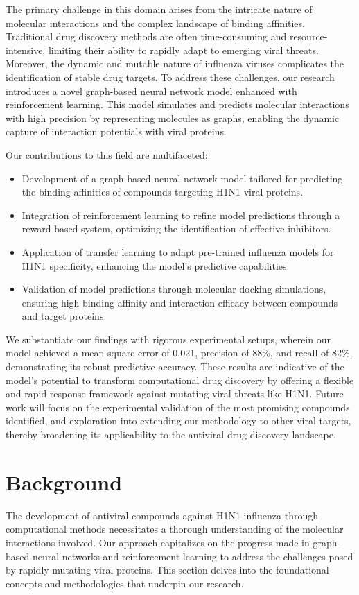 \documentclass{article}
\begin{document}
The primary challenge in this domain arises from the intricate nature of molecular interactions and the complex landscape of binding affinities. Traditional drug discovery methods are often time-consuming and resource-intensive, limiting their ability to rapidly adapt to emerging viral threats. Moreover, the dynamic and mutable nature of influenza viruses complicates the identification of stable drug targets. To address these challenges, our research introduces a novel graph-based neural network model enhanced with reinforcement learning. This model simulates and predicts molecular interactions with high precision by representing molecules as graphs, enabling the dynamic capture of interaction potentials with viral proteins. 

Our contributions to this field are multifaceted:
\begin{itemize}
    \item Development of a graph-based neural network model tailored for predicting the binding affinities of compounds targeting H1N1 viral proteins.
    \item Integration of reinforcement learning to refine model predictions through a reward-based system, optimizing the identification of effective inhibitors.
    \item Application of transfer learning to adapt pre-trained influenza models for H1N1 specificity, enhancing the model's predictive capabilities.
    \item Validation of model predictions through molecular docking simulations, ensuring high binding affinity and interaction efficacy between compounds and target proteins.
\end{itemize}

We substantiate our findings with rigorous experimental setups, wherein our model achieved a mean square error of 0.021, precision of 88\%, and recall of 82\%, demonstrating its robust predictive accuracy. These results are indicative of the model's potential to transform computational drug discovery by offering a flexible and rapid-response framework against mutating viral threats like H1N1. Future work will focus on the experimental validation of the most promising compounds identified, and exploration into extending our methodology to other viral targets, thereby broadening its applicability to the antiviral drug discovery landscape.

\section{Background}
The development of antiviral compounds against H1N1 influenza through computational methods necessitates a thorough understanding of the molecular interactions involved. Our approach capitalizes on the progress made in graph-based neural networks and reinforcement learning to address the challenges posed by rapidly mutating viral proteins. This section delves into the foundational concepts and methodologies that underpin our research.
\end{document}
